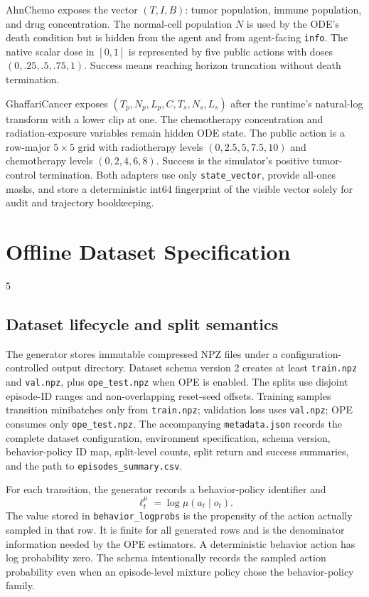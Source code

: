 \documentclass[10pt,twocolumn]{article}
\newcommand{\code}[1]{\texttt{#1}}
\newcommand{\behavior}{\mu}
\begin{document}
AhnChemo exposes the vector $(T,I,B)$: tumor population, immune population,
and drug concentration. The normal-cell population $N$ is used by the ODE's
death condition but is hidden from the agent and from agent-facing
\code{info}. The native scalar dose in $[0,1]$ is represented by five public
actions with doses $(0,.25,.5,.75,1)$. Success means reaching horizon
truncation without death termination.

GhaffariCancer exposes $(T_p,N_p,L_p,C,T_s,N_s,L_s)$ after the runtime's
natural-log transform with a lower clip at one. The chemotherapy concentration
and radiation-exposure variables remain hidden ODE state. The public action is
a row-major $5\times5$ grid with radiotherapy levels
$(0,2.5,5,7.5,10)$ and chemotherapy levels $(0,2,4,6,8)$. Success is the
simulator's positive tumor-control termination. Both adapters use only
\code{state\_vector}, provide all-ones masks, and store a deterministic
int64 fingerprint of the visible vector solely for audit and trajectory
bookkeeping.

\section{Offline Dataset Specification}
\label{sec:data}
5
\subsection{Dataset lifecycle and split semantics}

The generator stores immutable compressed NPZ files under a configuration-controlled output directory. Dataset schema version 2 creates at least \code{train.npz} and \code{val.npz}, plus \code{ope\_test.npz} when OPE is enabled. The splits use disjoint episode-ID ranges and non-overlapping reset-seed offsets. Training samples transition minibatches only from \code{train.npz}; validation loss uses \code{val.npz}; OPE consumes only \code{ope\_test.npz}. The accompanying \code{metadata.json} records the complete dataset configuration, environment specification, schema version, behavior-policy ID map, split-level counts, split return and success summaries, and the path to \code{episodes\_summary.csv}.

For each transition, the generator records a behavior-policy identifier and
\begin{equation}
    \ell_t^{\behavior} = \log \behavior(a_t\mid o_t).
\end{equation}
The value stored in \code{behavior\_logprobs} is the propensity of the action actually sampled in that row. It is finite for all generated rows and is the denominator information needed by the OPE estimators. A deterministic behavior action has log probability zero. The schema intentionally records the sampled action probability even when an episode-level mixture policy chose the behavior-policy family.
\end{document}
